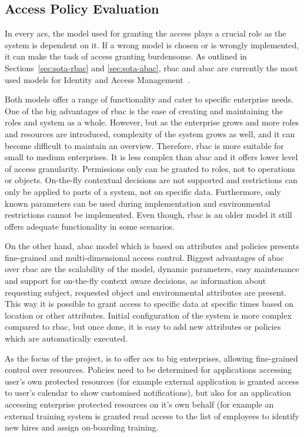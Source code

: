 \subsection{Access Policy Evaluation}\label{sec:analysis-access-policy}

In every \acrlong{acs}, the model used for granting the access plays a crucial role as the system is dependent on it. If a wrong model is chosen or is wrongly implemented, it can make the task of access granting burdensome. As outlined in Sections~\ref{sec:sota-rbac} and \ref{sec:sota-abac}, \acrshort{rbac} and \acrshort{abac} are currently the most used models for Identity and Access Management~\cite{2018BestV3}.

Both models offer a range of functionality and cater to specific enterprise needs. One of the big advantages of \acrshort{rbac} is the ease of creating and maintaining the roles and system as a whole. However, but as the enterprise grows and more roles and resources are introduced, complexity of the system grows as well, and it can become difficult to maintain an overview. Therefore, \acrshort{rbac} is more suitable for small to medium enterprises. It is less complex than \acrshort{abac} and it offers lower level of access granularity. Permissions only can be granted to roles, not to operations or objects. On-the-fly contextual decisions are not supported and restrictions can only be applied to parts of a system, not on specific data. Furthermore, only known parameters can be used during implementation and environmental restrictions cannot be implemented. Even though, \acrshort{rbac} is an older model it still offers adequate functionality in some scenarios.

On the other hand, \acrshort{abac} model which is based on attributes and policies presents fine-grained and multi-dimensional access control. Biggest advantages of \acrshort{abac} over \acrshort{rbac} are the scalability of the model, dynamic parameters, easy maintenance and support for on-the-fly context aware decisions, as information about requesting subject, requested object and environmental attributes are present.~\cite{Hakansson2019WhyEnterprises} This way it is possible to grant access to specific data at specific times based on location or other attributes. Initial configuration of the system is more complex compared to \acrshort{rbac}, but once done, it is easy to add new attributes or policies which are automatically executed. 

As the focus of the project, is to offer \acrlong{acs} to big enterprises, allowing fine-grained control over resources. Policies need to be determined for applications accessing user's own protected resources (for example external application is granted access to user's calendar to show customised notifications), but also for an application accessing enterprise protected resources on it's own behalf (for example an external training system is granted read access to the list of employees to identify new hires and assign on-boarding training.

